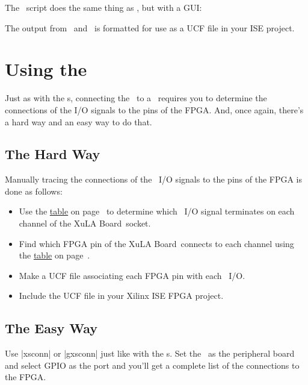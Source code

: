 \documentclass[letterpaper,11pt,oneside]{memoir}
\newcommand{\xula}{XuLA Board}
\begin{document}
\pagebreak %

The \ script does the same thing as , but with a GUI:


The output from \ and \ is formatted for use
as a UCF file in your ISE project. 


\section{Using the \rpi}

Just as with the \digpmod s, connecting the \product\ to a \rpi\ requires
you to determine the connections of the I/O signals to the pins of the FPGA.
And, once again, there's a hard way and an easy way to do that.

\subsection{The Hard Way}

Manually tracing the connections of the \rpi\ I/O signals to the pins of the FPGA
is done as follows:

\begin{itemize}
\item Use the \hyperref[tab:ChanneltoGPIOConnections]{table} on page~\pageref{tab:ChanneltoGPIOConnections} to determine 
	which \rpi\ I/O signal terminates on each channel of the \xula\ socket.
\item Find which FPGA pin of the \xula\ connects to each channel using the
	\hyperref[tab:ChanneltoFPGAConnections]{table} on page~\pageref{tab:ChanneltoFPGAConnections}.
\item Make a UCF file associating each FPGA pin with each \rpi\ I/O.
\item Include the UCF file in your Xilinx ISE FPGA project.
\end{itemize}

\subsection{The Easy Way}

Use |xsconn| or |gxsconn| just like with the \digpmod s.
Set the \rpi\ as the peripheral board and select GPIO as the port
and you'll get a complete list of the connections to the FPGA.
\end{document}
